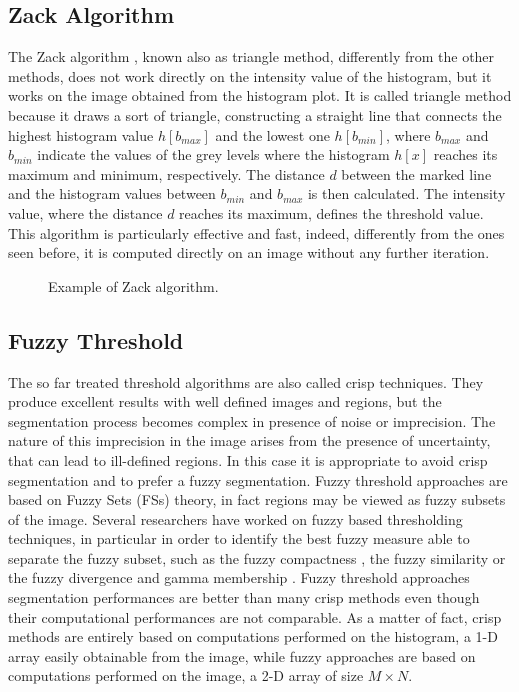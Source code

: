 \documentclass[final,a4paper,12pt,english]{UnicaPhdThesis3}
\begin{document}
	\subsection{Zack Algorithm} \label{Zack} %
	The Zack algorithm \cite{Zack}, known also as triangle method, differently from the other methods, does not work directly on the intensity value of the histogram, but it works on the image obtained from the histogram plot. It is called triangle method because it draws a sort of triangle, constructing a straight line that connects the highest histogram value $h[b_{max}]$ and the lowest one $h[b_{min}]$, where $b_{max}$ and $ b_{min}$ indicate the values of the grey levels where the histogram $h[x]$ reaches its maximum and minimum, respectively. The distance $d$ between the marked line and the histogram values between $b_{min}$ and $b_{max}$ is then calculated. The intensity value, where the distance $d$ reaches its maximum, defines the threshold value. This algorithm is particularly effective and fast, indeed, differently from the ones seen before, it is computed directly on an image without any further iteration.
	
	\begin{figure}[!tbp]
		\centering
		\caption{\label{fig:exampleZack}Example of Zack algorithm.}
	\end{figure}
	
	\subsection{Fuzzy Threshold} %
	The so far treated threshold algorithms are also called crisp techniques. They produce excellent results with well defined images and regions, but the segmentation process becomes complex in presence of noise or imprecision. The nature of this imprecision in the image arises from the presence of uncertainty, that can lead to ill-defined regions. In this case it is appropriate to avoid crisp segmentation and to prefer a fuzzy segmentation. Fuzzy threshold approaches are based on Fuzzy Sets (\acs{FS}s) theory, in fact regions may be viewed as fuzzy subsets of the image. Several researchers have worked on fuzzy based thresholding techniques, in particular in order to identify the best fuzzy measure able to separate the fuzzy subset, such as the fuzzy compactness \cite{Pal}, the fuzzy similarity \cite{Ramar} or the fuzzy divergence and gamma membership \cite{Cha03, MeloP}.
	Fuzzy threshold approaches segmentation performances are better than many crisp methods even though their computational performances are not comparable. As a matter of fact, crisp methods are entirely based on computations performed on the histogram, a 1-D array easily obtainable from the image, while fuzzy approaches are based on computations performed on the image, a 2-D array of size $M \times N$.
	
\end{document}
